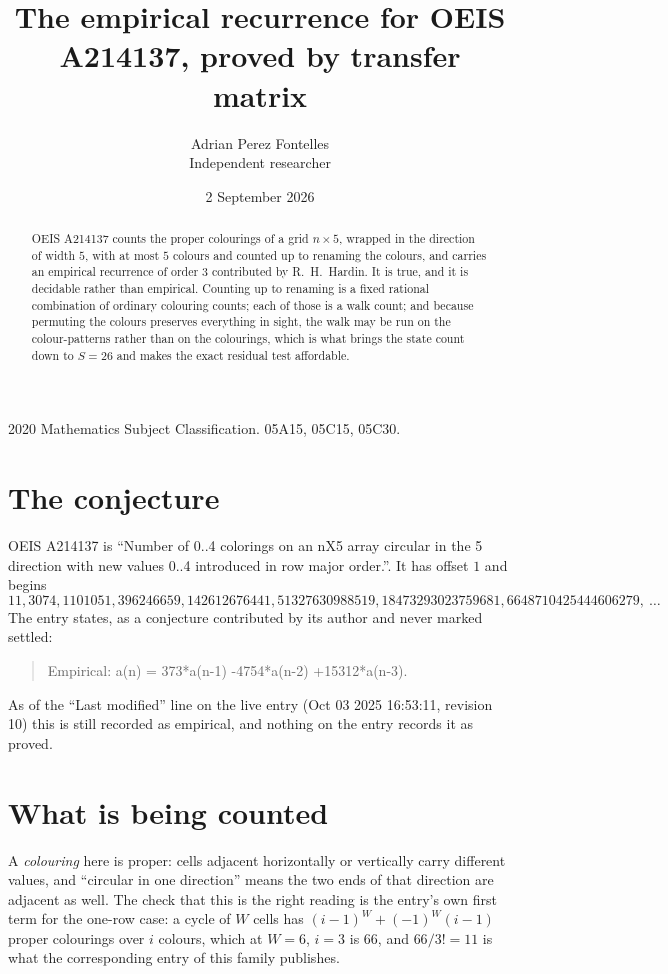 \documentclass[11pt,a4paper]{article}
\title{The empirical recurrence for OEIS A214137, proved by transfer matrix}
\author{Adrian Perez Fontelles\\ \small Independent researcher}
\date{2 September 2026}
\theoremstyle{plain}
\theoremstyle{definition}
\begin{document}
\maketitle

\begin{abstract}
OEIS A214137 counts the proper colourings of a grid $n\times5$, wrapped in the direction of width $5$, with at most $5$ colours and
counted up to renaming the colours, and carries an empirical recurrence of order $3$
contributed by R.~H.~Hardin. It is true, and it is decidable rather than empirical. Counting
up to renaming is a fixed rational combination of ordinary colouring counts; each of those is
a walk count; and because permuting the colours preserves everything in sight, the walk may be
run on the colour-patterns rather than on the colourings, which is what brings the state count
down to $S=26$ and makes the exact residual test affordable.
\end{abstract}

\noindent\small 2020 Mathematics Subject Classification. 05A15, 05C15, 05C30.\normalsize

\section{The conjecture}

OEIS A214137 is ``Number of 0..4 colorings on an nX5 array circular in the 5 direction with new values 0..4 introduced in row major order.''. It has offset $1$ and begins
\[
11, 3074, 1101051, 396246659, 142612676441, 51327630988519, 18473293023759681, 6648710425444606279,\ \dots
\]
The entry states, as a conjecture contributed by its author and never marked settled:
\begin{quote}
Empirical: a(n) = 373*a(n-1) -4754*a(n-2) +15312*a(n-3).
\end{quote}
As of the ``Last modified'' line on the live entry (Oct 03 2025 16:53:11, revision 10) this is still
recorded as empirical, and nothing on the entry records it as proved.

\section{What is being counted}

A \emph{colouring} here is proper: cells adjacent horizontally or vertically carry different
values, and ``circular in one direction'' means the two ends of that direction are adjacent as
well. The check that this is the right reading is the entry's own first term for the
one-row case: a cycle of $W$ cells has $(i-1)^W+(-1)^W(i-1)$ proper colourings over $i$
colours, which at $W=6$, $i=3$ is $66$, and $66/3!=11$ is what the corresponding entry of this
family publishes.
\end{document}
